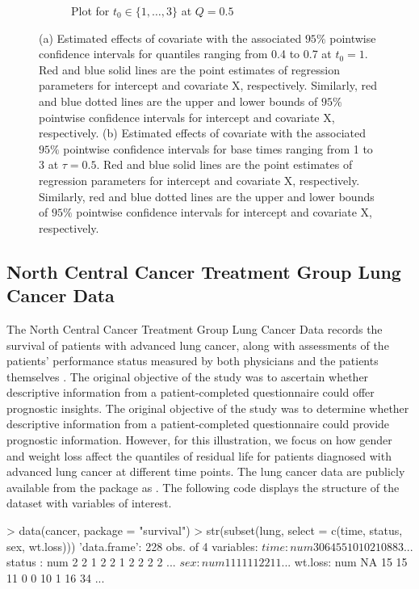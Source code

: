 \begin{figure}[ht]
\begin{subfigure}[b]{0.47\linewidth}
    \caption{Plot for $t_0\in\{1, \ldots, 3\}$ at $Q = 0.5$}    
    \label{fig:simulation_t0}
  \end{subfigure}
  \caption{(a) Estimated effects of covariate with the associated $95\%$ pointwise confidence intervals for quantiles ranging from 0.4 to 0.7 at $t_0=1$. Red and blue solid lines are the point estimates of regression parameters for intercept and covariate X, respectively. Similarly, red and blue dotted lines are the upper and lower bounds of $95\%$ pointwise confidence intervals for intercept and covariate X, respectively. 
    (b) Estimated effects of covariate with the associated $95\%$ pointwise confidence intervals for base times ranging from 1 to 3 at $\tau=0.5$. Red and blue solid lines are the point estimates of regression parameters for intercept and covariate X, respectively. Similarly, red and blue dotted lines are the upper and lower bounds of $95\%$ pointwise confidence intervals for intercept and covariate X, respectively.}
  \label{fig:simulation}
\end{figure}


\subsection{North Central Cancer Treatment Group Lung Cancer Data} \label{subsec:lung}

The North Central Cancer Treatment Group Lung Cancer Data records the survival of patients with advanced lung cancer, 
along with assessments of the patients' performance status measured by both physicians and the patients themselves 
\citep{loprinzi1994prospective}.
The original objective of the study was to ascertain whether descriptive information from a 
patient-completed questionnaire could offer prognostic insights.
The original objective of the study was to determine whether descriptive information from a patient-completed 
questionnaire could provide prognostic information.
However, for this illustration, we focus on how gender and weight loss affect the quantiles of residual life 
for patients diagnosed with advanced lung cancer at different time points.
The lung cancer data are publicly available from the  package \citep{survivalpackage} as .
The following code displays the structure of the  dataset with variables of interest.

\begin{example}
  > data(cancer, package = "survival")
  > str(subset(lung, select = c(time, status, sex, wt.loss)))
  'data.frame':	228 obs. of  4 variables:
  $ time   : num  306 455 1010 210 883 ...
  $ status : num  2 2 1 2 2 1 2 2 2 2 ...
  $ sex    : num  1 1 1 1 1 1 2 2 1 1 ...
  $ wt.loss: num  NA 15 15 11 0 0 10 1 16 34 ...
\end{example}
% 

